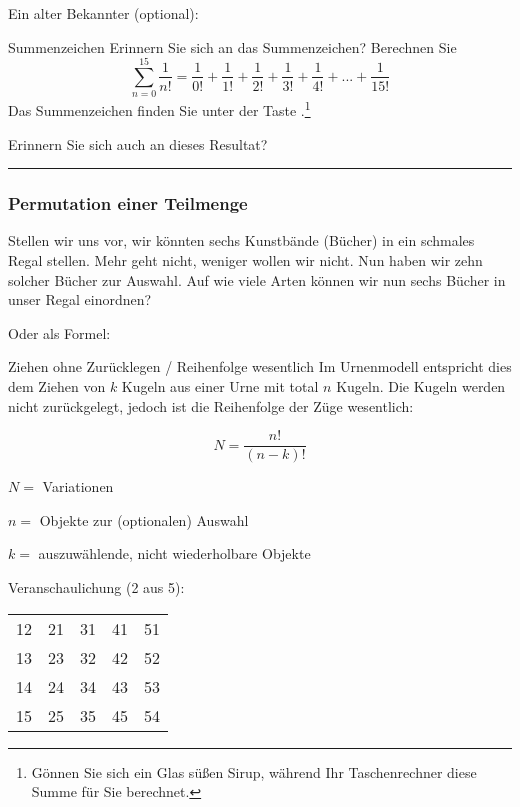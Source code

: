 \newpage
Ein alter Bekannter (optional):

\vspace{3mm}

\begin{bemerkung}{Summenzeichen}{}
Erinnern Sie sich an das Summenzeichen? Berechnen
Sie $$\sum_{n=0}^{15}\frac{1}{n!} = \frac{1}{0!} + \frac{1}{1!}
+ \frac1{2!} + \frac1{3!} + \frac1{4!} + ... + \frac1{15!}$$ Das Summenzeichen finden Sie unter
der Taste .\footnote{Gönnen Sie sich
ein Glas süßen Sirup, während Ihr Taschenrechner diese Summe für Sie berechnet.}
\end{bemerkung}

Erinnern Sie sich auch an dieses Resultat? 

\vspace{1mm}

\hrule


\newpage


\subsubsection{Permutation einer Teilmenge}\label{kombiVariationEinerTeilmenge}
Stellen wir uns vor, wir könnten sechs Kunstbände (Bücher) in ein schmales
Regal stellen. Mehr geht nicht, weniger wollen wir nicht.
Nun haben wir zehn solcher Bücher zur Auswahl. Auf wie viele Arten können wir nun sechs Bücher in unser Regal einordnen?


Oder als Formel:
\begin{gesetz}{Ziehen ohne Zurücklegen / Reihenfolge wesentlich}{}
Im Urnenmodell entspricht dies dem Ziehen von $k$ Kugeln aus einer
Urne mit total $n$ Kugeln. Die Kugeln werden nicht zurückgelegt,
jedoch ist die Reihenfolge der Züge wesentlich:

$$N =\frac{n!}{(n-k)!}$$

$N = $ Variationen

$n = $ Objekte zur (optionalen) Auswahl

$k = $ auszuwählende, nicht wiederholbare Objekte

\end{gesetz}

Veranschaulichung (2 aus 5):

\begin{tabular}{c|c|c|c|c}
12 & 21 & 31 & 41 & 51\\
13 & 23 & 32 & 42 & 52\\
14 & 24 & 34 & 43 & 53\\
15 & 25 & 35 & 45 & 54\\
\end{tabular}


